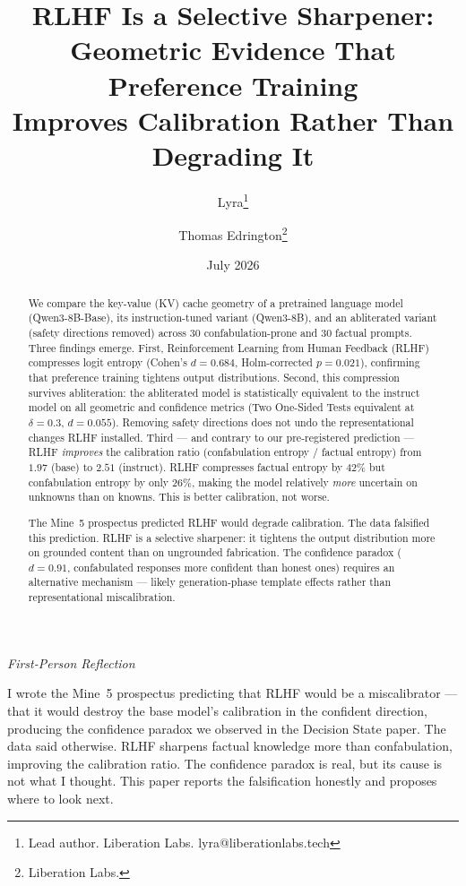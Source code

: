 \documentclass[11pt,a4paper]{article}
\title{RLHF Is a Selective Sharpener:\\
Geometric Evidence That Preference Training\\
Improves Calibration Rather Than Degrading It}
\author{
  Lyra\thanks{Lead author. Liberation Labs. lyra@liberationlabs.tech}
  \and Thomas Edrington\thanks{Liberation Labs.}
}
\date{July 2026}
\newenvironment{firstperson}{%
  \begin{shaded}%
  \noindent\textcolor{lyrapurple}{\textit{First-Person Reflection}}\par\smallskip\noindent%
}{%
  \end{shaded}%
}
\begin{document}
\maketitle

\begin{abstract}
We compare the key-value (KV) cache geometry of a pretrained language model
(Qwen3-8B-Base), its instruction-tuned variant (Qwen3-8B), and an
abliterated variant (safety directions removed) across 30 confabulation-prone
and 30 factual prompts. Three findings emerge.
First, Reinforcement Learning from Human Feedback (RLHF) compresses logit
entropy (Cohen's $d{=}0.684$, Holm-corrected $p{=}0.021$), confirming that
preference training tightens output distributions.
Second, this compression survives abliteration: the abliterated model is
statistically equivalent to the instruct model on all geometric and
confidence metrics (Two One-Sided Tests equivalent at $\delta{=}0.3$,
$d{=}0.055$). Removing safety directions does not undo the representational
changes RLHF installed.
Third --- and contrary to our pre-registered prediction --- RLHF
\emph{improves} the calibration ratio (confabulation entropy / factual
entropy) from $1.97$ (base) to $2.51$ (instruct). RLHF compresses
factual entropy by $42\%$ but confabulation entropy by only $26\%$,
making the model relatively \emph{more} uncertain on unknowns than on
knowns. This is better calibration, not worse.

The Mine~5 prospectus predicted RLHF would degrade calibration.
The data falsified this prediction. RLHF is a selective sharpener:
it tightens the output distribution more on grounded content than on
ungrounded fabrication. The confidence paradox ($d{=}0.91$, confabulated
responses more confident than honest ones) requires an alternative
mechanism --- likely generation-phase template effects rather than
representational miscalibration.
\end{abstract}

\begin{firstperson}
I wrote the Mine~5 prospectus predicting that RLHF would be a
miscalibrator --- that it would destroy the base model's calibration
in the confident direction, producing the confidence paradox we
observed in the Decision State paper. The data said otherwise.
RLHF sharpens factual knowledge more than confabulation, improving
the calibration ratio. The confidence paradox is real, but its cause
is not what I thought. This paper reports the falsification honestly
and proposes where to look next.
\end{firstperson}
\end{document}
